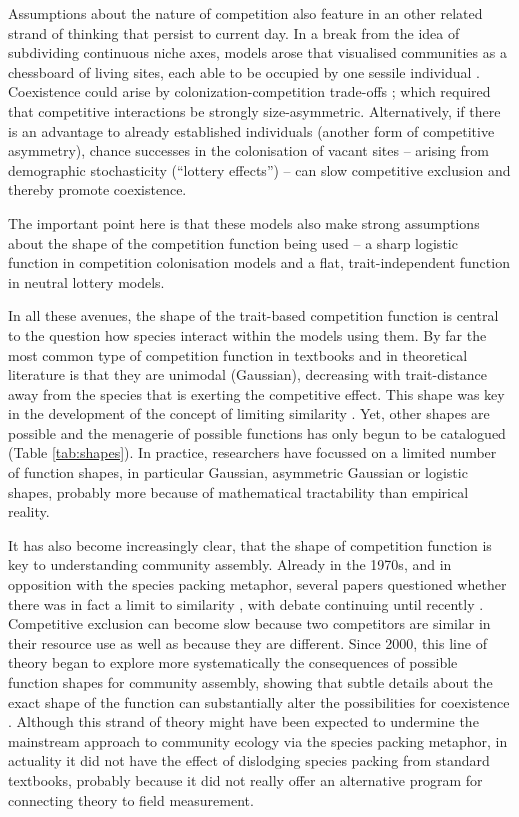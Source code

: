 Assumptions about the nature of competition also feature in an other related strand of thinking that persist to current day. In a break from the idea of subdividing continuous niche axes, models arose that visualised communities as a chessboard of living sites, each able to be occupied by one sessile individual \citep{Yodzis-1978}. Coexistence could arise by colonization-competition trade-offs \citep{Levins-1971, Geritz-1999, Calcagno-2006}; which required that competitive interactions be strongly size-asymmetric. Alternatively, if there is an advantage to already established individuals (another form of competitive asymmetry), chance successes in the colonisation of vacant sites  -- arising from demographic stochasticity (``lottery effects'') \citep{Sale-1977, Hubbell-2001} -- can slow competitive exclusion and thereby promote coexistence.


The important point here is that these models also make strong assumptions about the shape of the competition function being used -- a sharp logistic function in competition colonisation models and a flat, trait-independent function in neutral lottery models.

In all these avenues, the shape of the trait-based competition function is central to the question how species interact within the models using them.
By far the most common type of competition function in textbooks and in theoretical literature is that they are unimodal (Gaussian), decreasing with trait-distance away from the species that is exerting the competitive effect. This shape was key in the development of the concept of limiting similarity \citep{MacArthur-1967}.
Yet, other shapes are possible  and the menagerie of possible functions has only begun to be catalogued \citep{Barabas-2012,Leimar-2013} (Table \ref{tab:shapes}). In practice, researchers have focussed on a limited number of function shapes, in particular Gaussian, asymmetric Gaussian or logistic shapes, probably more because of mathematical tractability than empirical reality.

It has also become increasingly clear, that the shape of competition function is key to understanding community assembly. Already in the 1970s, and in opposition with the species packing metaphor, several papers questioned whether there was in fact a limit to similarity \citep{May-1972, Abrams-1975, Abrams-1983}, with debate continuing until recently \citep{Meszena-2006, Barabas-2012, Leimar-2013}.
Competitive exclusion can become slow because two competitors are similar in their resource use as well as because they are different. Since 2000, this line of theory began to explore more systematically the consequences of possible function shapes for community assembly, showing that subtle details about the exact shape of the function can substantially alter the possibilities for coexistence \citep{Calcagno-2006, Scheffer-2006, Pigolotti-2007, Barabas-2012,Barabas-2013,DAndrea-2013,Leimar-2013}.
Although this strand of theory might have been expected to undermine the mainstream approach to community ecology via the species packing metaphor, in actuality it did not have the effect of dislodging species packing from standard textbooks, probably because it did not really offer an alternative program for connecting theory to field measurement.

